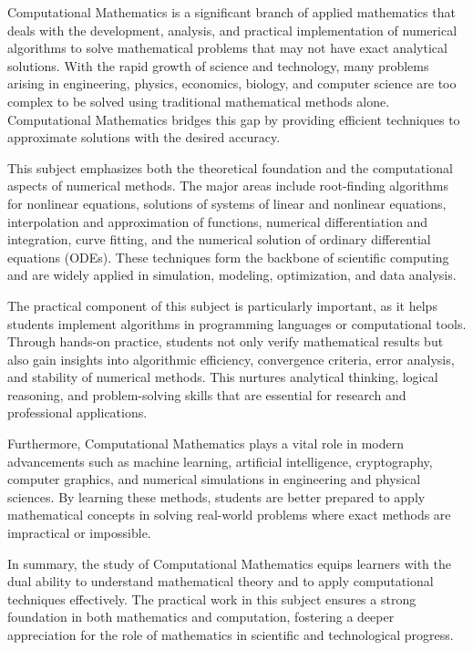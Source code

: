 {
Computational Mathematics is a significant branch of applied mathematics that deals with the development, analysis, and practical implementation of numerical algorithms to solve mathematical problems that may not have exact analytical solutions. With the rapid growth of science and technology, many problems arising in engineering, physics, economics, biology, and computer science are too complex to be solved using traditional mathematical methods alone. Computational Mathematics bridges this gap by providing efficient techniques to approximate solutions with the desired accuracy.

This subject emphasizes both the theoretical foundation and the computational aspects of numerical methods. The major areas include root-finding algorithms for nonlinear equations, solutions of systems of linear and nonlinear equations, interpolation and approximation of functions, numerical differentiation and integration, curve fitting, and the numerical solution of ordinary differential equations (ODEs). These techniques form the backbone of scientific computing and are widely applied in simulation, modeling, optimization, and data analysis.

The practical component of this subject is particularly important, as it helps students implement algorithms in programming languages or computational tools. Through hands-on practice, students not only verify mathematical results but also gain insights into algorithmic efficiency, convergence criteria, error analysis, and stability of numerical methods. This nurtures analytical thinking, logical reasoning, and problem-solving skills that are essential for research and professional applications.

Furthermore, Computational Mathematics plays a vital role in modern advancements such as machine learning, artificial intelligence, cryptography, computer graphics, and numerical simulations in engineering and physical sciences. By learning these methods, students are better prepared to apply mathematical concepts in solving real-world problems where exact methods are impractical or impossible.

In summary, the study of Computational Mathematics equips learners with the dual ability to understand mathematical theory and to apply computational techniques effectively. The practical work in this subject ensures a strong foundation in both mathematics and computation, fostering a deeper appreciation for the role of mathematics in scientific and technological progress.
}
